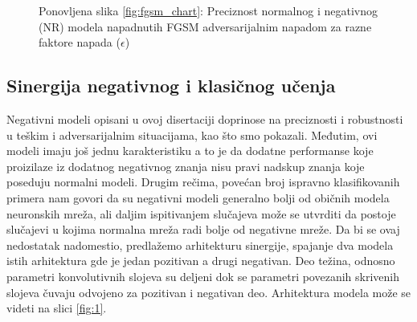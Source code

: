 \begin{figure}
    \centering
    {\newline Ponovljena slika \ref{fig:fgsm_chart}: Preciznost normalnog i negativnog (NR) modela napadnutih FGSM adversarijalnim napadom za razne faktore napada ($ \epsilon$)}
    
\end{figure}

\subsection*{Sinergija negativnog i klasičnog učenja}

Negativni modeli opisani u ovoj disertaciji doprinose na preciznosti i robustnosti u teškim i adversarijalnim situacijama, kao što smo pokazali. Međutim, ovi modeli imaju još jednu karakteristiku a to je da dodatne performanse koje proizilaze iz dodatnog negativnog znanja nisu pravi nadskup znanja koje poseduju normalni modeli. Drugim rečima, povećan broj ispravno klasifikovanih primera nam govori da su negativni modeli generalno bolji od običnih modela neuronskih mreža, ali daljim ispitivanjem slučajeva može se utvrditi da postoje slučajevi u kojima normalna mreža radi bolje od negativne mreže. Da bi se ovaj nedostatak nadomestio, predlažemo arhitekturu sinergije, spajanje dva modela istih arhitektura gde je jedan pozitivan a drugi negativan. Deo težina, odnosno parametri konvolutivnih slojeva su deljeni dok se parametri povezanih skrivenih slojeva čuvaju odvojeno za pozitivan i negativan deo. Arhitektura modela može se videti na slici \ref{fig:1}. 

